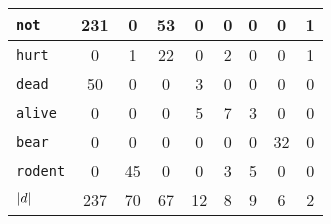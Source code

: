 \begin{table}[H]
\begin{tabular}{|l|c|c|c|c|c|c|c||c|}
					\texttt{not}           & 231                                     & \textcolor{irl}{0}                       & 53                                                & \textcolor{irl}{0}                  & \textcolor{irl}{0}                          & \textcolor{irl}{0}                                & \textcolor{irl}{0}                     & 1                     \\ \hline
					\texttt{hurt}          & \textcolor{irl}{0}                      & 1                                        & 22                                                & \textcolor{irl}{0}                  & 2                                           & \textcolor{irl}{0}                                & \textcolor{irl}{0}                     & 1                     \\ \hline
					\texttt{dead}          & 50                                      & \textcolor{irl}{0}                       & \textcolor{irl}{0}                                & 3                                   & \textcolor{irl}{0}                          & \textcolor{irl}{0}                                & \textcolor{irl}{0}                     & 0                     \\ \hline
					\texttt{alive}         & \textcolor{irl}{0}                      & \textcolor{irl}{0}                       & \textcolor{irl}{0}                                & 5                                   & 7                                           & 3                                                 & \textcolor{irl}{0}                     & 0                     \\ \hline
					\texttt{bear}          & \textcolor{irl}{0}                      & \textcolor{irl}{0}                       & \textcolor{irl}{0}                                & \textcolor{irl}{0}                  & \textcolor{irl}{0}                          & \textcolor{irl}{0}                                & 32                                     & 0                     \\ \hline
					\texttt{rodent}        & \textcolor{irl}{0}                      & 45                                       & \textcolor{irl}{0}                                & \textcolor{irl}{0}                  & 3                                           & 5                                                 & \textcolor{irl}{0}                     & 0                     \\ \hline\hline
					\( \abs{d} \)          & 237                                     & 70                                       & 67                                                & 12                                  & 8                                           & 9                                                 & 6                                      & 2                     \\ \hline

\end{tabular}
\end{table}
